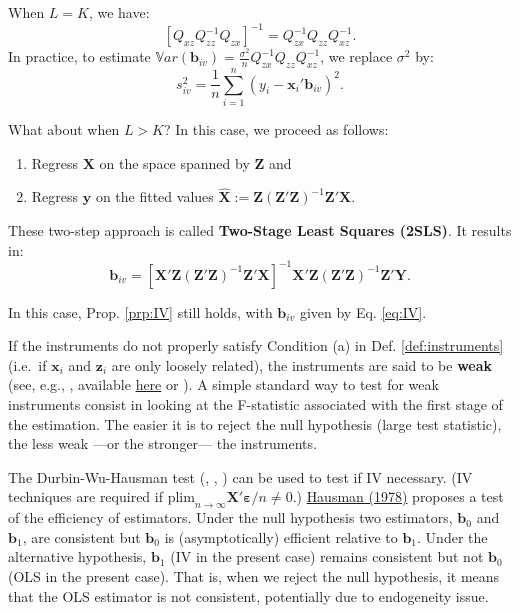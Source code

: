 \documentclass[
  12pt,
]{book}
\providecommand{\tightlist}{%
  \setlength{\itemsep}{0pt}\setlength{\parskip}{0pt}}
\theoremstyle{definition}
\theoremstyle{definition}
\theoremstyle{definition}
\theoremstyle{definition}
\theoremstyle{remark}
\begin{document}
When \(L=K\), we have:
\[
\left[Q_{xz}Q_{zz}^{-1}Q_{zx}\right]^{-1}=Q_{zx}^{-1}Q_{zz}Q_{xz}^{-1}.
\]
In practice, to estimate \(\mathbb{V}ar(\mathbf{b}_{iv}) = \frac{\sigma^2}{n}Q_{zx}^{-1}Q_{zz}Q_{xz}^{-1}\), we replace \(\sigma^2\) by:
\[
s_{iv}^2 = \frac{1}{n}\sum_{i=1}^{n} (y_i - \mathbf{x}_i'\mathbf{b}_{iv})^2.
\]

What about when \(L > K\)? In this case, we proceed as follows:

\begin{enumerate}
\def\labelenumi{\arabic{enumi}.}
\tightlist
\item
  Regress \(\mathbf{X}\) on the space spanned by \(\mathbf{Z}\) and
\item
  Regress \(\mathbf{y}\) on the fitted values \(\hat{\mathbf{X}}:=\mathbf{Z}(\mathbf{Z}'\mathbf{Z})^{-1}\mathbf{Z}'\mathbf{X}\).
\end{enumerate}

These two-step approach is called \textbf{Two-Stage Least Squares (2SLS)}. It results in:
\begin{equation}
\boxed{\mathbf{b}_{iv} = [\mathbf{X}'\mathbf{Z}(\mathbf{Z}'\mathbf{Z})^{-1}\mathbf{Z}'\mathbf{X}]^{-1}\mathbf{X}'\mathbf{Z}(\mathbf{Z}'\mathbf{Z})^{-1}\mathbf{Z}'\mathbf{Y}.} \label{eq:IV}
\end{equation}

In this case, Prop. \ref{prp:IV} still holds, with \(\mathbf{b}_{iv}\) given by Eq. \eqref{eq:IV}.

If the instruments do not properly satisfy Condition (a) in Def. \ref{def:instruments} (i.e.~if \(\mathbf{x}_i\) and \(\mathbf{z}_i\) are only loosely related), the instruments are said to be \textbf{weak} (see, e.g., \citet{stock_yogo_2005}, available \href{http://scholar.harvard.edu/files/stock/files/testing_for_weak_instruments_in_linear_iv_regression.pdf}{here} or \citet{Andrews_Stock_Sun_2019}). A simple standard way to test for weak instruments consist in looking at the F-statistic associated with the first stage of the estimation. The easier it is to reject the null hypothesis (large test statistic), the less weak ---or the stronger--- the instruments.

The Durbin-Wu-Hausman test (\citet{Durbin_1954}, \citet{Wu_1973}, \citet{Hausman_1978}) can be used to test if IV necessary. (IV techniques are required if \(\mbox{plim}_{n \rightarrow \infty} \mathbf{X}'\boldsymbol\varepsilon / n \ne 0\).) \href{http://www.jstor.org/stable/1913827?seq=1\#page_scan_tab_contents}{Hausman (1978)} proposes a test of the efficiency of estimators. Under the null hypothesis two estimators, \(\mathbf{b}_0\) and \(\mathbf{b}_1\), are consistent but \(\mathbf{b}_0\) is (asymptotically) efficient relative to \(\mathbf{b}_1\). Under the alternative hypothesis, \(\mathbf{b}_1\) (IV in the present case) remains consistent but not \(\mathbf{b}_0\) (OLS in the present case). That is, when we reject the null hypothesis, it means that the OLS estimator is not consistent, potentially due to endogeneity issue.
\end{document}

